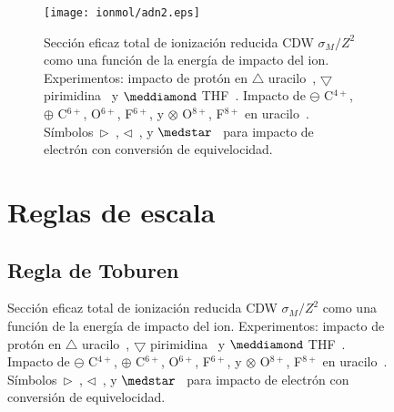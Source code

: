 \begin{figure}
\begin{figure}
\centering
\texttt{[image: ionmol/adn2.eps]}
\caption[Sección eficaz total de ionización reducida de moléculas (parte 2).]
{Sección eficaz total de ionización reducida CDW $\sigma_{M}/Z^2$ como una 
función de la energía de impacto del ion. Experimentos: impacto de protón
en $\triangle$ uracilo~\cite{itoh2013}, 
$\bigtriangledown$ pirimidina~\cite{wolff2014} y $\meddiamond$
THF~\cite{wang2016}. Impacto de $\ominus$ C$^{4+}$, $\oplus$ C$^{6+}$, 
O$^{6+}$, F$^{6+}$, y $\otimes$ O$^{8+}$, F$^{8+}$ en
uracilo~\cite{agnihotri2012,agnihotri2013}. 
Símbolos~$\rhd$~\cite{bug2017}, $\lhd$~\cite{wolf2019}, y 
$\medstar$~\cite{fuss2009} para impacto de electrón con conversión de 
equivelocidad.}
\label{fig:crossDNA_2}
\end{figure} 

\section{Reglas de escala}
\label{sec:scaling}
\subsection{Regla de Toburen}
\label{subsec:toburen}


\end{figure}
